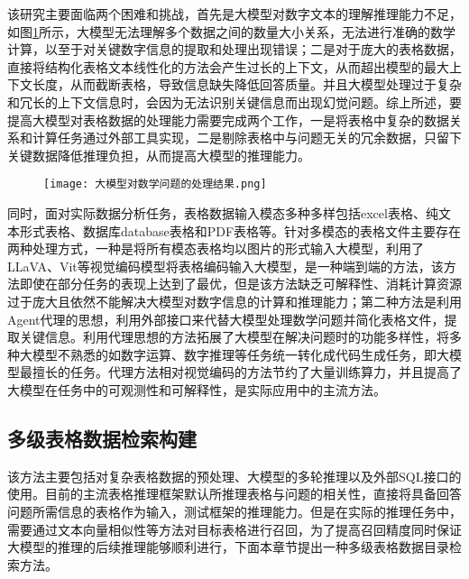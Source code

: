 该研究主要面临两个困难和挑战，首先是大模型对数字文本的理解推理能力不足，如图\ref{fig:4-1}所示，大模型无法理解多个数据之间的数量大小关系，无法进行准确的数学计算，以至于对关键数字信息的提取和处理出现错误；二是对于庞大的表格数据，直接将结构化表格文本线性化的方法会产生过长的上下文，从而超出模型的最大上下文长度，从而截断表格，导致信息缺失降低回答质量。并且大模型处理过于复杂和冗长的上下文信息时，会因为无法识别关键信息而出现幻觉问题。综上所述，要提高大模型对表格数据的处理能力需要完成两个工作，一是将表格中复杂的数据关系和计算任务通过外部工具实现，二是剔除表格中与问题无关的冗余数据，只留下关键数据降低推理负担，从而提高大模型的推理能力。
\begin{figure}[!htbp]
    \centering
    \texttt{[image: 大模型对数学问题的处理结果.png]}
    \label{fig:4-1}
\end{figure}
同时，面对实际数据分析任务，表格数据输入模态多种多样包括excel表格、纯文本形式表格、数据库database表格和PDF表格等。针对多模态的表格文件主要存在两种处理方式，一种是将所有模态表格均以图片的形式输入大模型\cite{zhengMultimodalTableUnderstanding2024}，利用了LLaVA、Vit\cite{bangMultitaskMultilingualMultimodal2023,chenCLIP2SceneLabelefficient3D2023,liuVisualInstructionTuning2023,radfordLearningTransferableVisual2021,dosovitskiyImageWorth16x162020}等视觉编码模型将表格编码输入大模型，是一种端到端的方法，该方法即使在部分任务的表现上达到了最优，但是该方法缺乏可解释性、消耗计算资源过于庞大且依然不能解决大模型对数字信息的计算和推理能力；第二种方法是利用Agent代理的思想，利用外部接口来代替大模型处理数学问题并简化表格文件，提取关键信息。利用代理思想的方法拓展了大模型在解决问题时的功能多样性，将多种大模型不熟悉的如数字运算、数字推理等任务统一转化成代码生成任务，即大模型最擅长的任务。代理方法相对视觉编码的方法节约了大量训练算力，并且提高了大模型在任务中的可观测性和可解释性，是实际应用中的主流方法。
\subsection{多级表格数据检索构建}
该方法主要包括对复杂表格数据的预处理、大模型的多轮推理以及外部SQL接口的使用。目前的主流表格推理框架默认所推理表格与问题的相关性，直接将具备回答问题所需信息的表格作为输入，测试框架的推理能力。但是在实际的推理任务中，需要通过文本向量相似性等方法对目标表格进行召回，为了提高召回精度同时保证大模型的推理的后续推理能够顺利进行，下面本章节提出一种多级表格数据目录检索方法。

